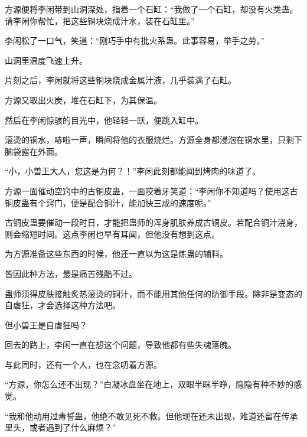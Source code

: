 \begin{this_body}
方源便将李闲带到山洞深处，指着一个石缸：“我做了一个石缸，却没有火类蛊。请李闲你帮忙，把这些铜块烧成汁水，装在石缸里。”

李闲松了一口气，笑道：“刚巧手中有批火系蛊。此事容易，举手之劳。”

山洞里温度飞速上升。

片刻之后，李闲就将这些铜块烧成金属汁液，几乎装满了石缸。

方源又取出火炭，堆在石缸下，为其保温。

然后在李闲惊骇的目光中，他轻轻一跃，便跳入缸中。

滚烫的铜水，哧啦一声，瞬间将他的衣服烧烂。方源全身都浸泡在铜水里，只剩下脑袋露在外面。

“小，小兽王大人，您这是为何？！”李闲此刻都能闻到烤肉的味道了。

方源一面催动空窍中的古铜皮蛊，一面咬着牙笑道：“李闲你不知道吗？使用这古铜皮蛊有个窍门，便是配合铜汁，能加快三成的速度呢。”

古铜皮蛊要催动一段时日，才能把蛊师的浑身肌肤养成古铜皮。若配合铜汁浇身，则会缩短时间。这点李闲也早有耳闻，但他没有想到这点。

为方源准备这些东西的时候，他还一直以为这是炼蛊的辅料。

皆因此种方法，最是痛苦残酷不过。

蛊师须得皮肤接触炙热滚烫的铜汁，而不能用其他任何的防御手段。除非是变态的自虐狂，才会选择这种方法吧。

但小兽王是自虐狂吗？

回去的路上，李闲一直在想这个问题，导致他都有些失魂落魄。

与此同时，还有一个人，也在念叨着方源。

“方源，你怎么还不出现？”白凝冰盘坐在地上，双眼半眯半睁，隐隐有种不妙的感觉。

“我和他动用过毒誓蛊，他绝不敢见死不救。但他现在还未出现，难道还留在传承里头，或者遇到了什么麻烦？”

\end{this_body}

